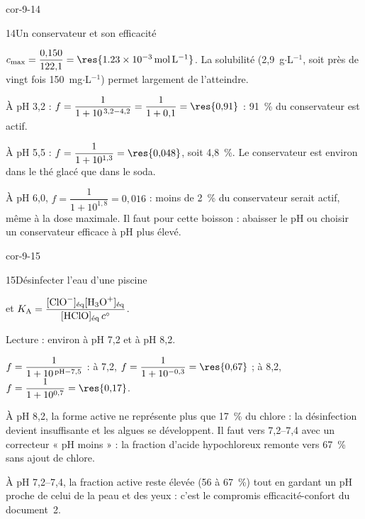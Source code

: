 \begin{blocLivre}{cor-9-14}
\begin{corrige}{14}{Un conservateur et son efficacité}
\begin{questions}
\item $c_{\max}=\dfrac{0{,}150}{122{,}1}=\res{\qty{1,23e-3}{mol.L^{-1}}}$. La solubilité (2,9~g$\cdot$L$^{-1}$, soit
près de vingt fois 150~mg$\cdot$L$^{-1}$) permet largement de l'atteindre.
\item À pH 3,2 : $f=\dfrac{1}{1+10^{\,3{,}2-4{,}2}}=\dfrac{1}{1+0{,}1}=\res{0{,}91}$ : 91~\% du conservateur est actif.
\item À pH 5,5 : $f=\dfrac{1}{1+10^{1{,}3}}=\res{0{,}048}$, soit 4,8~\%. Le conservateur est environ
 dans le thé glacé que dans le soda.
\item À pH 6,0, $f=\dfrac{1}{1+10^{1{,}8}}=0{,}016$ : moins de 2~\% du conservateur serait actif, même à la dose
maximale. Il faut  pour cette boisson : abaisser le pH ou choisir un
conservateur efficace à pH plus élevé.
\end{questions}
\end{corrige}
\end{blocLivre}
\begin{blocLivre}{cor-9-15}
\begin{corrige}{15}{Désinfecter l'eau d'une piscine}
\begin{questions}
\item {} et $K_\mathrm{A}=\dfrac{[\ce{ClO-}]_\text{éq}[\ce{H3O+}]_\text{éq}}{[\ce{HClO}]_\text{éq}\,\cst}$.
\item Lecture : environ  à pH 7,2 et  à pH 8,2.
\item $f=\dfrac{1}{1+10^{\,\mathrm{pH}-7{,}5}}$ : à 7,2, $f=\dfrac{1}{1+10^{-0{,}3}}=\res{0{,}67}$ ; à 8,2,
$f=\dfrac{1}{1+10^{0{,}7}}=\res{0{,}17}$.
\item À pH 8,2, la forme active ne représente plus que 17~\% du chlore : la désinfection devient insuffisante et les
algues se développent. Il faut  vers 7,2--7,4 avec un correcteur « pH moins » : la fraction
d'acide hypochloreux remonte vers 67~\% sans ajout de chlore.
\item À pH 7,2--7,4, la fraction active reste élevée (56 à 67~\%) tout en gardant un pH proche de celui de la peau et
des yeux : c'est le compromis efficacité-confort du document~2.
\end{questions}
\end{corrige}
\end{blocLivre}
